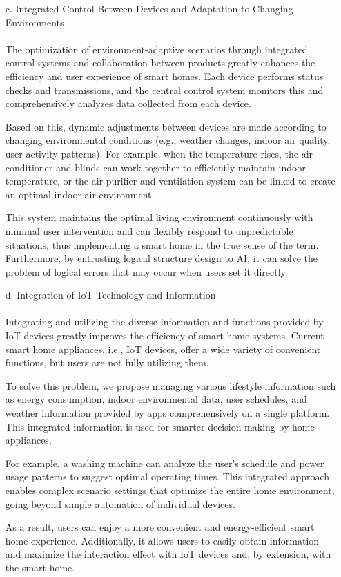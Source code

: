 \documentclass[conference]{IEEEtran}
\begin{document}
\begin{itemize}
    \item [c.] Integrated Control Between Devices and Adaptation to Changing Environments \\ \\ 
    The optimization of environment-adaptive scenarios through integrated control systems and collaboration between products greatly enhances the efficiency and user experience of smart homes. Each device performs status checks and transmissions, and the central control system monitors this and comprehensively analyzes data collected from each device.
    
    \hspace{1em} Based on this, dynamic adjustments between devices are made according to changing environmental conditions (e.g., weather changes, indoor air quality, user activity patterns). For example, when the temperature rises, the air conditioner and blinds can work together to efficiently maintain indoor temperature, or the air purifier and ventilation system can be linked to create an optimal indoor air environment.
    
    \hspace{1em} This system maintains the optimal living environment continuously with minimal user intervention and can flexibly respond to unpredictable situations, thus implementing a smart home in the true sense of the term. Furthermore, by entrusting logical structure design to AI, it can solve the problem of logical errors that may occur when users set it directly.\\
    
    \item [d.] Integration of IoT Technology and Information \\ \\
    Integrating and utilizing the diverse information and functions provided by IoT devices greatly improves the efficiency of smart home systems. Current smart home appliances, i.e., IoT devices, offer a wide variety of convenient functions, but users are not fully utilizing them.
    
    \hspace{1em} To solve this problem, we propose managing various lifestyle information such as energy consumption, indoor environmental data, user schedules, and weather information provided by apps comprehensively on a single platform. This integrated information is used for smarter decision-making by home appliances.
    
    \hspace{1em} For example, a washing machine can analyze the user's schedule and power usage patterns to suggest optimal operating times. This integrated approach enables complex scenario settings that optimize the entire home environment, going beyond simple automation of individual devices.
    
    \hspace{1em} As a result, users can enjoy a more convenient and energy-efficient smart home experience. Additionally, it allows users to easily obtain information and maximize the interaction effect with IoT devices and, by extension, with the smart home.
\end{itemize}
\end{document}
